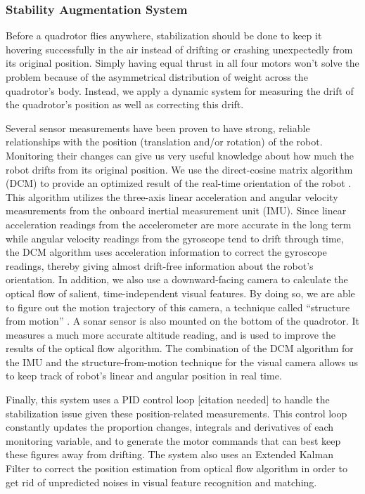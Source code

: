 \documentclass[12pt, letterpaper]{article}
\begin{document}
\subsubsection{Stability Augmentation System}

Before a quadrotor flies anywhere, stabilization should be done to keep it hovering successfully in the air instead of drifting or crashing unexpectedly from its original position. Simply having equal thrust in all four motors won't solve the problem because of the asymmetrical distribution of weight across the quadrotor's body. Instead, we apply a dynamic system for measuring the drift of the quadrotor's position as well as correcting this drift.

Several sensor measurements have been proven to have strong, reliable relationships with the position (translation and/or rotation) of the robot. Monitoring their changes can give us very useful knowledge about how much the robot drifts from its original position. We use the direct-cosine matrix algorithm (DCM) to provide an optimized result of the real-time orientation of the robot . This algorithm utilizes the three-axis linear acceleration and angular velocity measurements from the onboard inertial measurement unit (IMU). Since linear acceleration readings from the accelerometer are more accurate in the long term while angular velocity readings from the gyroscope tend to drift through time, the DCM algorithm uses acceleration information to correct the gyroscope readings, thereby giving almost drift-free information about the robot's orientation. In addition, we also use a downward-facing camera to calculate the optical flow of salient, time-independent visual features. By doing so, we are able to figure out the motion trajectory of this camera, a technique called ``structure from motion'' . A sonar sensor is also mounted on the bottom of the quadrotor. It measures a much more accurate altitude reading, and is used to improve the results of the optical flow algorithm. The combination of the DCM algorithm for the IMU and the structure-from-motion technique for the visual camera allows us to keep track of robot's linear and angular position in real time.

Finally, this system uses a PID control loop [citation needed] to handle the stabilization issue given these position-related measurements. This control loop constantly updates the proportion changes, integrals and derivatives of each monitoring variable, and to generate the motor commands that can best keep these figures away from drifting. The system also uses an Extended Kalman Filter to correct the position estimation from optical flow algorithm in order to get rid of unpredicted noises in visual feature recognition and matching.
\end{document}
